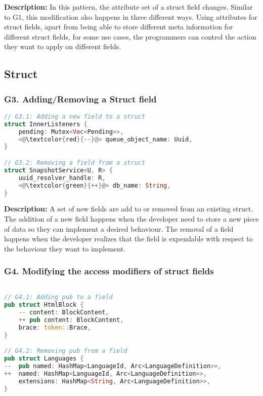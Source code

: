 \noindent \textbf{Description:} In this pattern, the attribute set of a struct field changes. Similar to G1, this modification also happens in three different ways. Using attributes for struct fields, apart from being able to store different meta information for different struct fields, for some use cases, the programmers can control the action they want to apply on different fields.

\subsection{Struct}
\subsubsection{G3. Adding/Removing a Struct field}

\begin{lstlisting}[language=Rust, style=colouredRust, label={l3}]
// G3.1: Adding a new field to a struct
struct InnerListeners {
    pending: Mutex<Vec<Pending>>,
    <@\textcolor{red}{--}@> queue_object_name: Uuid,
}

// G3.2: Removing a field from a struct
struct SnapshotService<U, R> {
    uuid_resolver_handle: R,
    <@\textcolor{green}{++}@> db_name: String,
}
\end{lstlisting}

\noindent \textbf{Description:} A set of new fields are add to or removed from an existing struct. The addition of a new field happens when the developer need to store a new piece of data so they can implement a desired behaviour. The removal of a field  happens when the developer realizes that the field is expendable with respect to the behaviour they want to implement.

\subsubsection{G4. Modifying the access modifiers of struct fields}

\begin{lstlisting}[language=Rust, style=colouredRust, label={l3}]

// G4.1: Adding pub to a field
pub struct HtmlBlock {
    -- content: BlockContent,
    ++ pub content: BlockContent,
    brace: token::Brace,
} 

// G4.2: Removing pub from a field
pub struct Languages {
--  pub named: HashMap<LanguageId, Arc<LanguageDefinition>>,
++  named: HashMap<LanguageId, Arc<LanguageDefinition>>,
    extensions: HashMap<String, Arc<LanguageDefinition>>,
}

\end{lstlisting}

